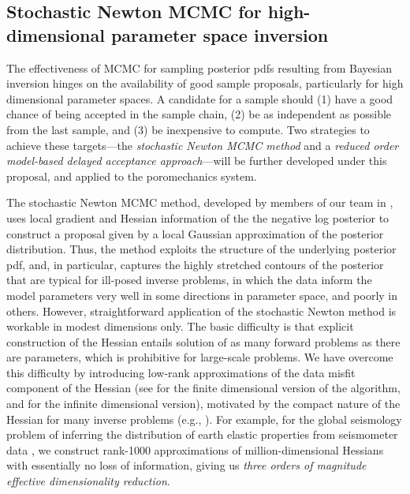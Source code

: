 \documentclass[11pt,final]{article}%
\renewcommand{\citep}{\cite}
\begin{document}
\subsection{Stochastic Newton MCMC for high-dimensional parameter
  space inversion} 
\label{sec:mcmc}


The effectiveness of MCMC for sampling posterior pdfs
resulting from Bayesian inversion hinges on the
availability of good sample proposals, particularly for high
dimensional parameter spaces. A candidate for a sample should (1) have
a good chance of being accepted in the sample chain, (2) be as
independent as possible from the last sample,
and (3) be inexpensive to compute. Two strategies to achieve these
targets---the {\em stochastic Newton MCMC method} and a {\em reduced
  order model-based delayed acceptance approach}---will be further
developed under this proposal, and applied to the poromechanics
system.

The stochastic Newton MCMC method, developed by members of our team in
\citep{MartinWilcoxBursteddeEtAl12, Bui-ThanhGhattas12d,
  PetraMartinStadlerEtAl13}, uses local gradient and Hessian
information of the the negative log posterior to construct a
proposal given by a local Gaussian approximation of the
posterior distribution. Thus, the method exploits the structure of
the underlying posterior pdf, and, in particular, captures the
highly stretched contours of the posterior that are typical for
ill-posed inverse problems, in which the data inform the model
parameters very well in some directions in parameter space, and poorly
in others. However, straightforward application of the stochastic
Newton method
is workable in modest dimensions only. The basic difficulty is that
explicit construction of the Hessian entails solution of as many
forward problems as there are parameters, which is prohibitive for
large-scale problems. We have overcome this difficulty by introducing
low-rank approximations of the data misfit component of the Hessian (see
\cite{MartinWilcoxBursteddeEtAl12,FlathWilcoxAkcelikEtAl11,
  Bui-ThanhBursteddeGhattasEtAl12_gbfinalist} for the finite
dimensional version of the algorithm, and
\cite{Bui-ThanhGhattasMartinEtAl13, Bui-ThanhGhattas12e} for the
infinite dimensional version), motivated by the compact nature of the
Hessian for many inverse problems (e.g., \cite{Bui-ThanhGhattas12a,
  Bui-ThanhGhattas12, FlathWilcoxAkcelikEtAl11,
  Bui-ThanhBursteddeGhattasEtAl12_gbfinalist,
  Bui-ThanhGhattasMartinEtAl13, MartinWilcoxBursteddeEtAl12,
  Bui-ThanhGhattas12f}). For example, for the global seismology
problem of inferring the distribution of earth elastic properties from
seismometer data \cite{Bui-ThanhGhattasMartinEtAl13,
  Bui-ThanhBursteddeGhattasEtAl12_gbfinalist}, we construct rank-1000
approximations of million-dimensional Hessians with essentially no
loss of information, giving us {\em three orders of magnitude
  effective dimensionality reduction}.
\end{document}
